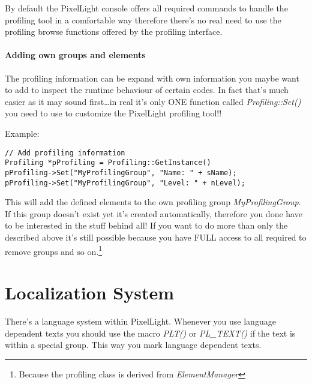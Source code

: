 By default the PixelLight console offers all required commands to handle the profiling tool in a comfortable way therefore there's no real need to use the profiling browse functions offered by the profiling interface.


\paragraph{Adding own groups and elements}
The profiling information can be expand with own information you maybe want to add to inspect the runtime behaviour of certain codes. In fact that's much easier as it may sound first\ldots in real it's only ONE function called \emph{Profiling::Set()} you need to use to customize the PixelLight profiling tool!!

Example:

\begin{lstlisting}[caption=Profiling usage example]
// Add profiling information
Profiling *pProfiling = Profiling::GetInstance()
pProfiling->Set("MyProfilingGroup", "Name: " + sName);
pProfiling->Set("MyProfilingGroup", "Level: " + nLevel);
\end{lstlisting}

This will add the defined elements to the own profiling group \emph{MyProfilingGroup}. If this group doesn't exist yet it's created automatically, therefore you done have to be interested in the stuff behind all! If you want to do more than only the described above it's still possible because you have FULL access to all required to remove groups and so on.\footnote{Because the profiling class is derived from \emph{ElementManager}}




\section{Localization System}
There's a language system within PixelLight. Whenever you use language dependent texts you should use the macro \emph{PLT()} or \emph{PL\_TEXT()} if the text is within a special group. This way you mark language dependent texts.

